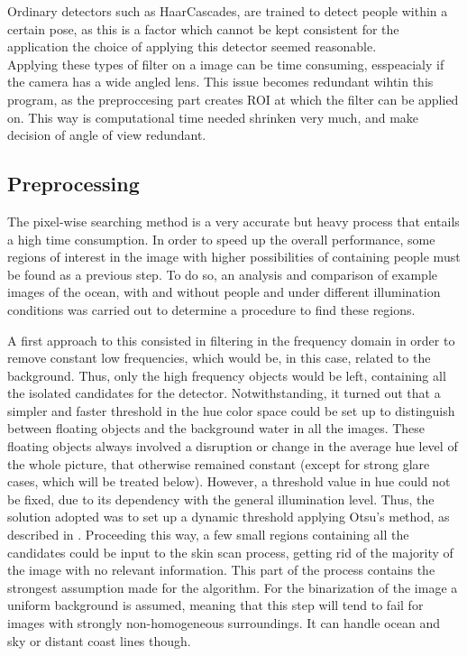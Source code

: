 Ordinary detectors such as HaarCascades, are trained to detect people within a certain pose,
as this is a factor which cannot be kept consistent for the application the choice of applying this detector seemed reasonable. \\

Applying these types of filter on a image can be time consuming, esspeacialy if the camera has a wide angled lens.
This issue becomes redundant wihtin this program, as the preproccesing part creates ROI at which the filter can be applied on.
This way is computational time needed shrinken very much,  and make decision of angle of view redundant. \\


\subsection{Preprocessing}
The pixel-wise searching method is a very accurate but heavy process that entails a high time consumption.
In order to speed up the overall performance, some regions of interest in the image with higher possibilities
of containing people must be found as a previous step. 
To do so, an analysis and comparison of example images of the ocean, with and without people and under
different illumination conditions was carried out to determine a procedure to find these regions.

A first approach to this consisted in filtering in the frequency domain in order to remove constant low frequencies,
which would be, in this case, related to the background. Thus, only the high frequency objects would be left, containing all the isolated candidates for the detector.
Notwithstanding, it turned out that a simpler and faster threshold in the hue color space could be set up
to distinguish between floating objects and the background water in all the images. 
These floating objects always involved a disruption or change in the average hue level of the whole picture,
that otherwise remained constant (except for strong glare cases, which will be treated below).
However, a threshold value in hue could not be fixed, due to its dependency with the general illumination level. 
Thus, the solution adopted was to set up a dynamic threshold applying Otsu's method, as described in \cite{Ref:Otsu}.
Proceeding this way, a few small regions containing all the candidates could be input to the skin scan process,
getting rid of the majority of the image with no relevant information. 
This part of the process contains the strongest assumption made for the algorithm. 
For the binarization of the image a uniform background is assumed, meaning that this step will tend to fail for
images with strongly non-homogeneous surroundings. 
It can handle ocean and sky or distant coast lines though. 

